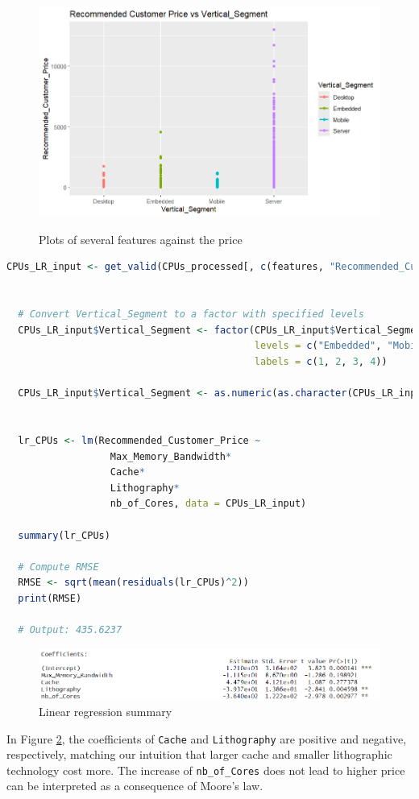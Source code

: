 \begin{figure}[ht]
  \\[\smallskipamount]
  \includegraphics[width=0.45\linewidth]{img/segment-price.png}
  \vspace{0.5cm}
  \caption{Plots of several features against the price}
  \label{figure:factor-price}
\end{figure}

\begin{lstlisting}[language = R]
  CPUs_LR_input <- get_valid(CPUs_processed[, c(features, "Recommended_Customer_Price")])


  # Convert Vertical_Segment to a factor with specified levels
  CPUs_LR_input$Vertical_Segment <- factor(CPUs_LR_input$Vertical_Segment, 
                                           levels = c("Embedded", "Mobile", "Desktop", "Server"),
                                           labels = c(1, 2, 3, 4))
  
  CPUs_LR_input$Vertical_Segment <- as.numeric(as.character(CPUs_LR_input$Vertical_Segment))
  
  
  lr_CPUs <- lm(Recommended_Customer_Price ~ 
                  Max_Memory_Bandwidth*
                  Cache*
                  Lithography*
                  nb_of_Cores, data = CPUs_LR_input)
  
  summary(lr_CPUs)

  # Compute RMSE
  RMSE <- sqrt(mean(residuals(lr_CPUs)^2))
  print(RMSE)
  
  # Output: 435.6237
\end{lstlisting}

\begin{figure}[ht]
  \centering
  \includegraphics{img/lr-summary.png}
  \vspace{0.5cm}
  \caption{Linear regression summary}
  \label{figure:lr-summary}
\end{figure}

In Figure \ref{figure:lr-summary}, the coefficients of \texttt{Cache} and \texttt{Lithography} are positive and negative, respectively, matching our intuition that larger cache and smaller  lithographic technology cost more. The increase of \texttt{nb\_of\_Cores} does not lead to higher price can be interpreted as a consequence of Moore's law.


